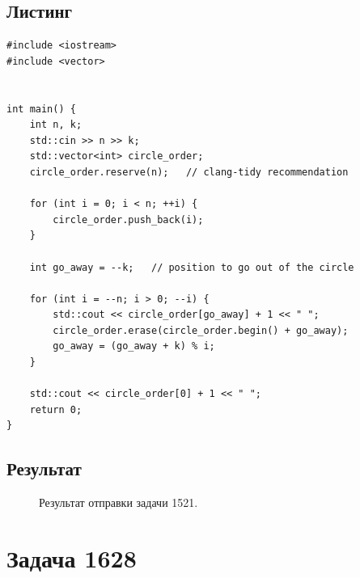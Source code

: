 \documentclass[a5paper, 10pt]{article}
\theoremstyle{definition}
\theoremstyle{plain}
\theoremstyle{remark}
\begin{document}
\subsection{Листинг}

\begin{center}
\begin{lstlisting}[label=some-code,caption={Исходный код для 1521}]
#include <iostream>
#include <vector>


int main() {
    int n, k;
    std::cin >> n >> k;
    std::vector<int> circle_order;
    circle_order.reserve(n);   // clang-tidy recommendation

    for (int i = 0; i < n; ++i) {
        circle_order.push_back(i);
    }

    int go_away = --k;   // position to go out of the circle

    for (int i = --n; i > 0; --i) {
        std::cout << circle_order[go_away] + 1 << " ";
        circle_order.erase(circle_order.begin() + go_away);
        go_away = (go_away + k) % i;
    }

    std::cout << circle_order[0] + 1 << " ";
    return 0;
}

\end{lstlisting}
\end{center}

\newpage

\subsection{Результат}
\begin{figure}[h!]
\caption{Результат отправки задачи 1521.}
\end{figure}




\newpage
\section{Задача 1628}
\end{document}
